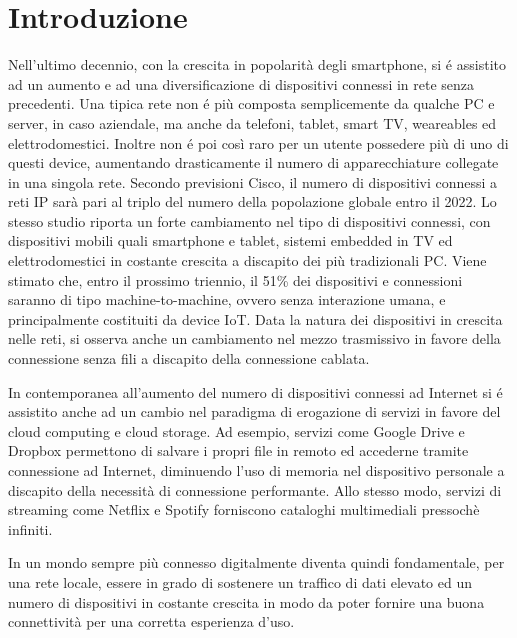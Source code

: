 \raggedbottom
\chapter{Introduzione}

Nell'ultimo decennio, con la crescita in popolarit\`a degli smartphone, si \'e assistito ad un aumento e ad una diversificazione di dispositivi connessi in rete senza precedenti.
Una tipica rete non \'e pi\`u composta semplicemente da qualche PC e server, in caso aziendale, ma anche da telefoni, tablet, smart TV, weareables ed elettrodomestici.
Inoltre non \'e poi cos\`i raro per un utente possedere pi\`u di uno di questi device, aumentando drasticamente il numero di apparecchiature collegate in una singola rete.
Secondo previsioni Cisco, il numero di dispositivi connessi a reti IP sar\`a pari al triplo del numero della popolazione globale entro il 2022\cite{CVI}.
Lo stesso studio riporta un forte cambiamento nel tipo di dispositivi connessi, con dispositivi mobili quali smartphone e tablet, sistemi embedded in TV ed elettrodomestici in costante crescita a discapito dei pi\`u tradizionali PC.
Viene stimato che, entro il prossimo triennio, il 51\% dei dispositivi e connessioni saranno di tipo machine-to-machine, ovvero senza interazione umana, e principalmente costituiti da device IoT.
Data la natura dei dispositivi in crescita nelle reti, si osserva anche un cambiamento nel mezzo trasmissivo in favore della connessione senza fili a discapito della connessione cablata.

In contemporanea all'aumento del numero di dispositivi connessi ad Internet si \'e assistito anche ad un cambio nel paradigma di erogazione di servizi in favore del cloud computing e cloud storage.
Ad esempio, servizi come Google Drive e Dropbox permettono di salvare i propri file in remoto ed accederne tramite connessione ad Internet, diminuendo l'uso di memoria nel dispositivo personale a discapito della necessit\`a di connessione performante.
Allo stesso modo, servizi di streaming come Netflix e Spotify forniscono cataloghi multimediali pressoch\`e infiniti.

In un mondo sempre pi\`u connesso digitalmente diventa quindi fondamentale, per una rete locale, essere in grado di sostenere un traffico di dati elevato ed un numero di dispositivi in costante crescita in modo da poter fornire una buona connettivit\`a per una corretta esperienza d'uso.

